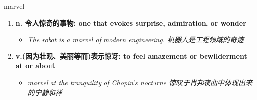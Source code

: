 
\begin{frame}
{\huge marvel}
\begin{center}
\begin{enumerate}\Large
  \item \textbf{n. 令人惊奇的事物: one that evokes surprise, admiration, or wonder}
  \begin{itemize}
    \item \em{\Large{The robot is a marvel of modern engineering. 机器人是工程领域的奇迹}}
  \end{itemize}
  \item \textbf{v.(因为壮观、美丽等而)表示惊讶: to feel amazement or bewilderment at or about}
  \begin{itemize}
    \item \em{\Large{marvel at the tranquility of Chopin’s nocturne 惊叹于肖邦夜曲中体现出来的宁静和祥}}
  \end{itemize}
\end{enumerate}
\end{center}
\end{frame}
